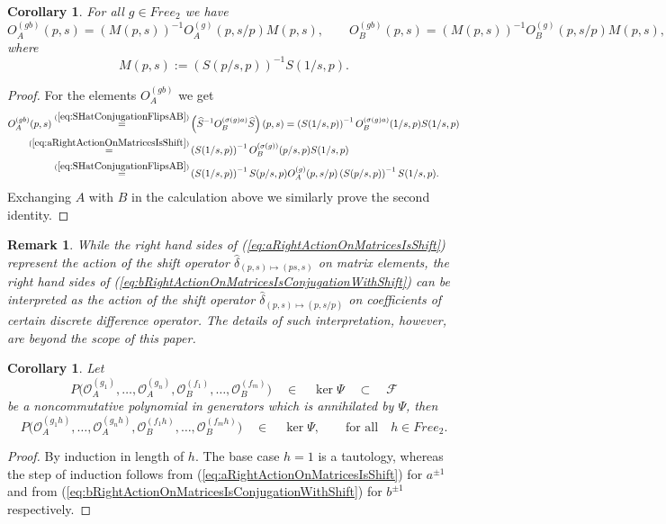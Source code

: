 \documentclass{amsart}
\newtheorem{corollary}[theorem]{Corollary}
\newtheorem{remark}[theorem]{Remark}
\newcommand{\Oa}{\mathcal O_A}
\newcommand{\Ob}{\mathcal O_B}
\begin{document}
\begin{corollary}
For all $g\in Free_2$ we have
\begin{equation}
O_A^{(gb)}(p,s)=\left(M(p,s)\right)^{-1}O_A^{(g)}(p,s/p)M(p,s),\qquad O_B^{(gb)}(p,s)=\left(M(p,s)\right)^{-1}O_B^{(g)}(p,s/p)M(p,s),
\label{eq:bRightActionOnMatricesIsConjugationWithShift}
\end{equation}
where
\begin{equation*}
M(p,s):=\left(S(p/s,p)\right)^{-1}S(1/s,p).
\end{equation*}
\end{corollary}
\begin{proof}
For the elements $O_A^{(gb)}$ we get
\begin{equation*}
\begin{aligned}
O_A^{(gb)}(p,s)\overset{(\ref{eq:SHatConjugationFlipsAB})}{=}&\left(\widehat S^{-1}O_B^{(\sigma(g)a)}\widehat S\right)(p,s)=\left(S(1/s,p)\right)^{-1}O_B^{(\sigma(g)a)}(1/s,p)S(1/s,p)\\
\overset{(\ref{eq:aRightActionOnMatricesIsShift})}{=}&\left(S(1/s,p)\right)^{-1}O_B^{(\sigma(g))}(p/s,p)S(1/s,p)\\
\overset{(\ref{eq:SHatConjugationFlipsAB})}{=}&\left(S(1/s,p)\right)^{-1}S(p/s,p)O_A^{(g)}(p,s/p)\left(S(p/s,p)\right)^{-1}S(1/s,p).
\end{aligned}
\end{equation*}
Exchanging $A$ with $B$ in the calculation above we similarly prove the second identity.
\end{proof}

\begin{remark}
While the right hand sides of (\ref{eq:aRightActionOnMatricesIsShift}) represent the action of the shift operator $\widehat\delta_{(p,s)\mapsto(ps,s)}$ on matrix elements, the right hand sides of (\ref{eq:bRightActionOnMatricesIsConjugationWithShift}) can be interpreted as the action of the shift operator $\widehat\delta_{(p,s)\mapsto(p,s/p)}$ on coefficients of certain discrete difference operator. The details of such interpretation, however, are beyond the scope of this paper.
\end{remark}

\begin{corollary}
Let 
\begin{equation*}
P\big(\Oa^{(g_1)},\dots,\Oa^{(g_n)},\Ob^{(f_1)},\dots,\Ob^{(f_m)}\big)\quad\in\quad\ker\Psi\quad\subset\quad\mathcal F
\end{equation*}
be a noncommutative polynomial in generators which is annihilated by $\Psi$, then
\begin{equation*}
P\big(\Oa^{(g_1h)},\dots,\Oa^{(g_nh)},\Ob^{(f_1h)},\dots,\Ob^{(f_mh)}\big)\quad\in\quad\ker\Psi,\qquad\textrm{for all}\quad h\in Free_2.
\end{equation*}
\label{cor:RightActionPreservesKernelOfPsi}
\end{corollary}
\begin{proof}
By induction in length of $h$. The base case $h=1$ is a tautology, whereas the step of induction follows from (\ref{eq:aRightActionOnMatricesIsShift}) for $a^{\pm1}$ and from  (\ref{eq:bRightActionOnMatricesIsConjugationWithShift}) for $b^{\pm1}$ respectively.
\end{proof}
\end{document}
